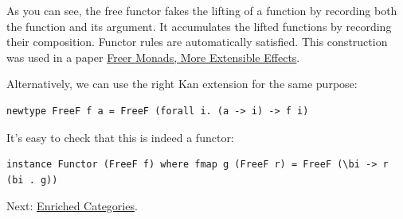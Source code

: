 As you can see, the free functor fakes the lifting of a function by
recording both the function and its argument. It accumulates the lifted
functions by recording their composition. Functor rules are
automatically satisfied. This construction was used in a paper
\href{http://okmij.org/ftp/Haskell/extensible/more.pdf}{Freer Monads,
More Extensible Effects}.

Alternatively, we can use the right Kan extension for the same purpose:

\begin{verbatim}
newtype FreeF f a = FreeF (forall i. (a -> i) -> f i)
\end{verbatim}

It's easy to check that this is indeed a functor:

\begin{verbatim}
instance Functor (FreeF f) where fmap g (FreeF r) = FreeF (\bi -> r (bi . g))
\end{verbatim}

Next:
\href{https://bartoszmilewski.com/2017/05/13/enriched-categories/}{Enriched
Categories}.
